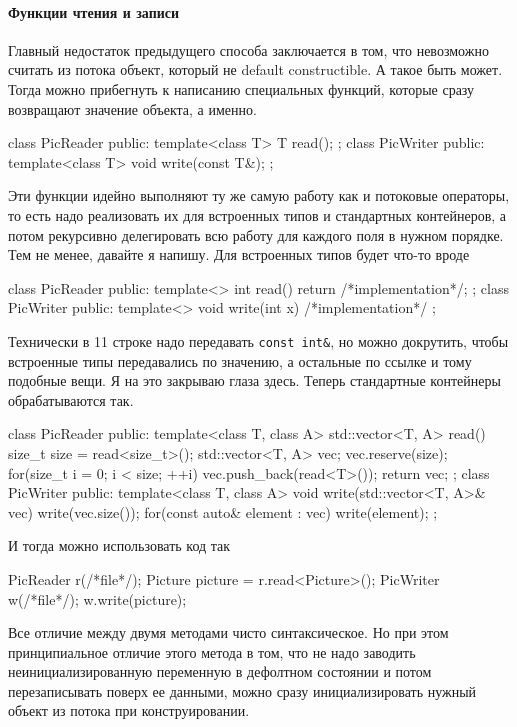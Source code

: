 \paragraph{Функции чтения и записи}
Главный недостаток предыдущего способа заключается в том, что невозможно считать из потока объект, который не default constructible.
А такое быть может.
Тогда можно прибегнуть к написанию специальных функций, которые сразу возвращают значение объекта, а именно.
\begin{cppcode}
class PicReader {
public:
  template<class T>
  T read();
};
class PicWriter {
public:
  template<class T>
  void write(const T&);
};
\end{cppcode}
Эти функции идейно выполняют ту же самую работу как и потоковые операторы, то есть надо реализовать их для встроенных типов и стандартных контейнеров, а потом рекурсивно делегировать всю работу для каждого поля в нужном порядке.
Тем не менее, давайте я напишу.
Для встроенных типов будет что-то вроде
\begin{cppcode}
class PicReader {
public:
  template<>
  int read() {
    return /*implementation*/;
  }
};
class PicWriter {
public:
  template<>
  void write(int x) {
    /*implementation*/
  }
};
\end{cppcode}
Технически в 11 строке надо передавать \verb"const int&", но можно докрутить, чтобы встроенные типы передавались по значению, а остальные по ссылке и тому подобные вещи.
Я на это закрываю глаза здесь.
Теперь стандартные контейнеры обрабатываются так.
\begin{cppcode}
class PicReader {
public:
  template<class T, class A>
  std::vector<T, A> read() {
    size_t size = read<size_t>();
    std::vector<T, A> vec;
    vec.reserve(size);
    for(size_t i = 0; i < size; ++i)
      vec.push_back(read<T>());
    return vec;
  }
};
class PicWriter {
public:
  template<class T, class A>
  void write(std::vector<T, A>& vec) {
    write(vec.size());
    for(const auto& element : vec)
      write(element);
  }
};
\end{cppcode}
И тогда можно использовать код так
\begin{cppcode}
PicReader r(/*file*/);
Picture picture = r.read<Picture>();
PicWriter w(/*file*/);
w.write(picture);
\end{cppcode}
Все отличие между двумя методами чисто синтаксическое.
Но при этом принципиальное отличие этого метода в том, что не надо заводить неинициализированную переменную в дефолтном состоянии и потом перезаписывать поверх ее данными, можно сразу инициализировать нужный объект из потока при конструировании.

